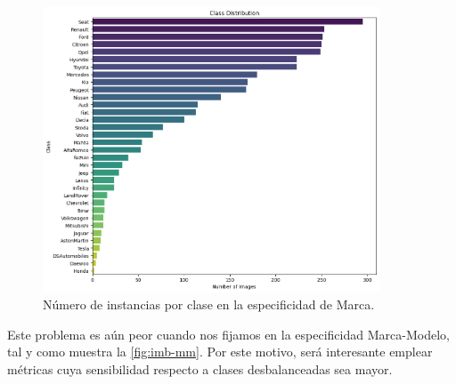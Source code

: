 \begin{figure}[h]
	\centering
	\includegraphics[width=100mm]{img/imbalance-marca.png}
	\caption{Número de instancias por clase en la especificidad de Marca.}
	\label{fig:imb-m}
\end{figure}

Este problema es aún peor cuando nos fijamos en la especificidad Marca-Modelo, tal
y como muestra la \autoref{fig:imb-mm}. Por este motivo, será interesante emplear
métricas cuya sensibilidad respecto a clases desbalanceadas sea mayor.

